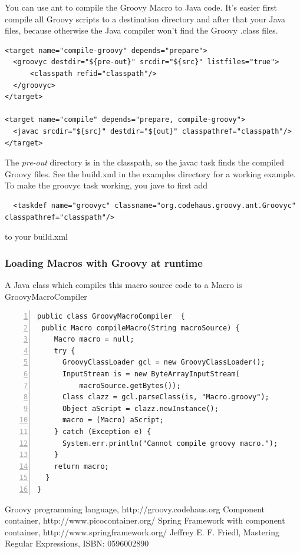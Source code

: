 \documentclass[a4paper,pdftex]{article}
\begin{document}
You can use ant to compile the Groovy Macro to Java code. It's easier first compile 
all Groovy scripts to a destination directory and after that your Java files, because
otherwise the Java compiler won't find the Groovy .class files.

\begin{verbatim}
<target name="compile-groovy" depends="prepare">
  <groovyc destdir="${pre-out}" srcdir="${src}" listfiles="true">
      <classpath refid="classpath"/>
  </groovyc>
</target>

<target name="compile" depends="prepare, compile-groovy">
  <javac srcdir="${src}" destdir="${out}" classpathref="classpath"/>
</target>
\end{verbatim}

The {\it pre-out} directory is in the classpath, so the javac task finds the compiled Groovy 
files. See the build.xml in the examples directory for a working example. To make the
groovyc task working, you jave to first add

\begin{verbatim}
  <taskdef name="groovyc" classname="org.codehaus.groovy.ant.Groovyc" classpathref="classpath"/> 
\end{verbatim}

to your build.xml

\subsubsection{Loading Macros with Groovy at runtime}
A Java class which compiles this macro source code to a Macro is GroovyMacroCompiler

\begin{Verbatim}[gobble=0,frame=single,numbers=left,fontsize=\small]
public class GroovyMacroCompiler  {
 public Macro compileMacro(String macroSource) {
    Macro macro = null;
    try {
      GroovyClassLoader gcl = new GroovyClassLoader();
      InputStream is = new ByteArrayInputStream(
          macroSource.getBytes());
      Class clazz = gcl.parseClass(is, "Macro.groovy");
      Object aScript = clazz.newInstance();
      macro = (Macro) aScript;
    } catch (Exception e) {
      System.err.println("Cannot compile groovy macro.");
    }
    return macro;
  }
}
\end{Verbatim}

\begin{thebibliography}{}
 Groovy programming language, http://groovy.codehaus.org
 Component container, http://www.picocontainer.org/
 Spring Framework with component container, http://www.springframework.org/
 Jeffrey E. F. Friedl, Mastering Regular Expressions, ISBN: 0596002890
\end{thebibliography}
\end{document}
